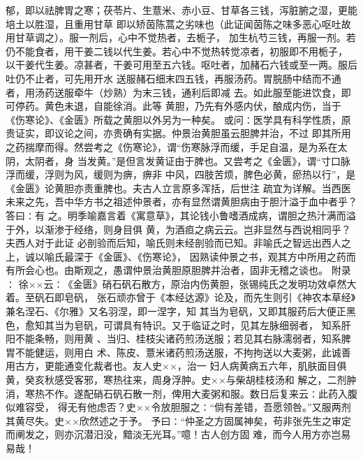 \documentclass[a4paper,12pt,UTF8,twoside]{ctexbook}
\begin{document}
郁，即以祛脾胃之寒；茯苓片、生薏米、赤小豆、甘草各三钱，泻脏腑之湿，更能培土以胜湿，且重用甘草 
即以矫茵陈蒿之劣味也（此证闻茵陈之味多恶心呕吐故用甘草调之）。服一剂后，心中不觉热者，去栀子， 
加生杭芍三钱，再服一剂。若仍不能食者，用干姜二钱以代生姜。若心中不觉热转觉凉者，初服即不用栀子， 
以干姜代生姜。凉甚者，干姜可用至五六钱。呕吐者，加赭石六钱或至一两。服后吐仍不止者，可先用开水 
送服赭石细末四五钱，再服汤药。胃脘肠中结而不通者，用汤药送服牵牛（炒熟）为末三钱，通利后即减 
去。如此服至能进饮食，即可停药。黄色未退，自能徐消。此等 
黄胆，乃先有外感内伏，酿成内伤，当于《伤寒论》、《金匮》所载之黄胆以外另为一种矣。 
或问∶医学具有科学性质，原贵证实，即议论之间，亦贵确有实据。仲景治黄胆虽云胆脾并治，不过 
即其所用之药揣摩而得。然尝考之《伤寒论》，谓“伤寒脉浮而缓，手足自温，是为系在太阴，太阴者，身 
当发黄。”是但言发黄证由于脾也。又尝考之《金匮》，谓“寸口脉浮而缓，浮则为风，缓则为痹，痹非 
中风，四肢苦烦，脾色必黄，瘀热以行”，是《金匮》论黄胆亦责重脾也。夫古人立言原多浑括，后世注 
疏宜为详解。当西医未来之先，吾中华方书之祖述仲景者，亦有显然谓黄胆病由于胆汁溢于血中者乎？答曰∶有 
之。明季喻嘉言着《寓意草》，其论钱小鲁嗜酒成病，谓胆之热汁满而溢于外，以渐渗于经络，则身目俱 
黄，为酒疸之病云云。岂非显然与西说相同乎？夫西人对于此证 
必剖验而后知，喻氏则未经剖验而已知。非喻氏之智远出西人之上，诚以喻氏最深于《金匮》、《伤寒论》， 
因熟读仲景之书，观其方中所用之药而有所会心也。由斯观之，愚谓仲景治黄胆原胆脾并治者，固非无稽之谈也。 
附录∶ 
徐××云∶《金匮》硝石矾石散方，原治内伤黄胆，张锡纯氏之发明功效卓然大着。至矾石即皂矾， 
张石顽亦曾于《本经达源》论及，而先生则引《神农本草经》兼名涅石、《尔雅》又名羽涅，即一涅字，知 
其当为皂矾，又即其服药后大便正黑色，愈知其当为皂矾，可谓具有特识。又于临证之时，见其左脉细弱者， 
知系肝阳不能条畅，则用黄 、当归、桂枝尖诸药煎汤送服；若见其右脉濡弱者，知系脾胃不能健运，则用白 
术、陈皮、薏米诸药煎汤送服，不拘拘送以大麦粥，此诚善用古方，更能通变化裁者也。友人史××，治一 
妇人病黄病五六年，肌肤面目俱黄，癸亥秋感受客邪，寒热往来，周身浮肿。史××与柴胡桂枝汤和 
解之，二剂肿消，寒热不作。遂配硝石矾石散一剂，俾用大麦粥和服。数日后复来云∶此药入腹似难容受， 
得无有他虑否？史××令放胆服之∶“倘有差错，吾愿领咎。”又服两剂其黄尽失。史××欣然述之于予。 
予曰∶“仲圣之方固属神矣，苟非张先生之审定而阐发之，则亦沉潜汨没，黯淡无光耳。”噫！古人创方固 
难，而今人用方亦岂易易哉！ 
\end{document}
